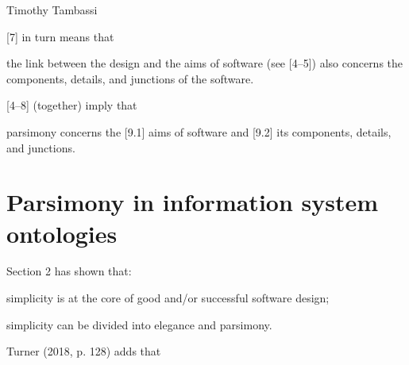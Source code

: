 \begin{artengenv}{Timothy Tambassi}
\begin{enumerate}
\end{enumerate}

[7] in turn means that



\setcounter{saveenumtambassi}{\value{enumi}}

\begin{enumerate}[label={[\arabic*]}]

\setcounter{enumi}{\value{saveenumtambassi}}

\item the link between the design and the aims of software (see [4–5]) also concerns the components, details, and junctions of the software.

\end{enumerate}

[4–8] (together) imply that



\setcounter{saveenumtambassi}{\value{enumi}}

\begin{enumerate}[label={[\arabic*]}]

\setcounter{enumi}{\value{saveenumtambassi}}

\item parsimony concerns the [9.1] aims of software and [9.2] its components, details, and junctions.

\end{enumerate}

\section{Parsimony in information system ontologies}

Section 2 has shown that:

\enlargethispage{1.5\baselineskip}

\setcounter{saveenumtambassi}{\value{enumi}}

\begin{enumerate}[label={[\arabic*]}]

\setcounter{enumi}{\value{saveenumtambassi}}

\item simplicity is at the core of good and/or successful software design;

\item simplicity can be divided into elegance and parsimony.

\end{enumerate}

Turner (2018, p. 128) adds that




\end{artengenv}
